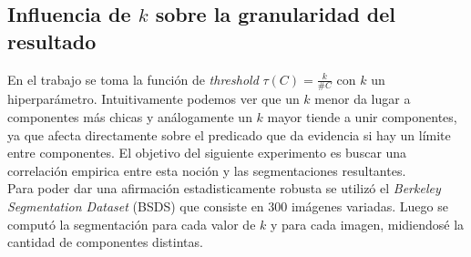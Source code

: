 \subsection{Influencia de $k$ sobre la granularidad del resultado}
En el trabajo \cite{Felzenszwalb2004} se toma la funci\'on de \textit{threshold} $\tau(C)=\frac{k}{\#C}$ con $k$ un hiperparámetro. Intuitivamente podemos ver que un $k$ menor da lugar a componentes más chicas y análogamente un $k$ mayor tiende a unir componentes, ya que afecta directamente sobre el predicado que da evidencia si hay un l\'imite entre componentes. El objetivo del siguiente experimento es buscar una correlaci\'on empirica entre esta noci\'on y las segmentaciones resultantes. \\
Para poder dar una afirmaci\'on estadisticamente robusta se utiliz\'o el \textit{Berkeley Segmentation Dataset} (BSDS) \cite{BSDS} que consiste en 300 im\'agenes variadas. Luego se comput\'o la segmentaci\'on para cada valor de $k$ y para cada imagen, midiendos\'e la cantidad de componentes distintas. 

